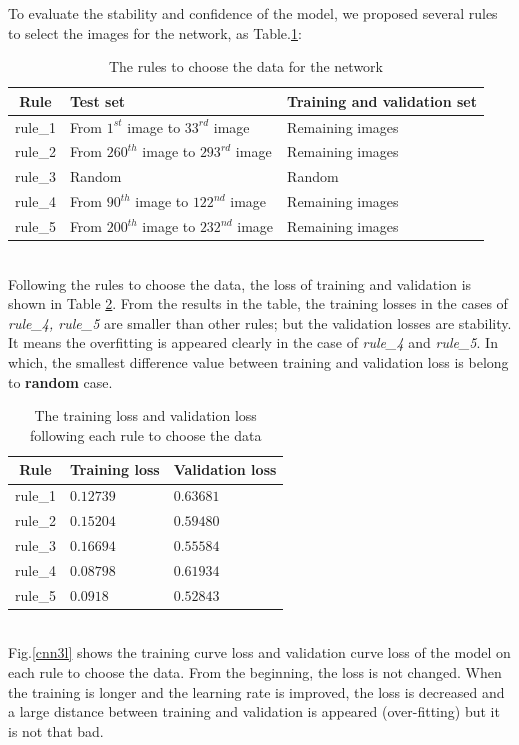 \documentclass[12pt,a4paper]{article}
\begin{document}
To evaluate the stability and confidence of the model, we proposed several rules to select the images for the network, as Table.\ref{choosedata}:\\
\begin{table}[h!]
	\centering
	\begin{tabular}{c l l}
	Rule & Test set & Training and validation set \\ \hline
	rule\_1 & From $1^{st}$ image to $33^{rd}$ image & Remaining images \\ \hline
	rule\_2 & From $260^{th}$ image to $293^{rd}$ image & Remaining images\\ \hline
	rule\_3 & Random & Random \\ \hline
	rule\_4 & From $90^{th}$ image to $122^{nd}$ image & Remaining images\\ \hline
	rule\_5 & From $200^{th}$ image to $232^{nd}$ image & Remaining images \\ \hline
	\end{tabular}
	\caption{The rules to choose the data for the network}
	\label{choosedata}
\end{table}~\\
Following the rules to choose the data, the loss of training and validation is shown in Table \ref{losschoosedata}. From the results in the table, the training losses in the cases of \textit{rule\_4, rule\_5} are smaller than other rules; but the validation losses are stability. It means the overfitting is appeared clearly in the case of \textit{rule\_4} and \textit{rule\_5}. In which, the smallest difference value between training and validation loss is belong to \textbf{random} case.
\begin{table}[h!]
	\centering
	\begin{tabular}{c l l}
	Rule & Training loss & Validation loss \\ \hline
	rule\_1 & $0.12739$ & $0.63681$ \\ \hline
	rule\_2 & $0.15204$ & $0.59480$ \\ \hline
	rule\_3 & $0.16694$ & $0.55584$ \\ \hline
	rule\_4 & $0.08798$ & $0.61934$ \\ \hline
	rule\_5 & $0.0918$ & $0.52843$ \\ \hline
	\end{tabular}
	\caption{The training loss and validation loss following each rule to choose the data}
	\label{losschoosedata}
\end{table}~\\[0.1cm]
Fig.\ref{cnn3l} shows the training curve loss and validation curve loss of the model on each rule to choose the data. From the beginning, the loss is not changed. When the training is longer and the learning rate is improved, the loss is decreased and a large distance between training and validation is appeared (over-fitting) but it is not that bad.
\end{document}
